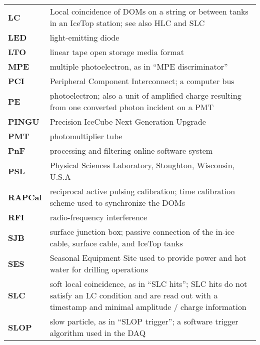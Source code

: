 \begin{longtable}{p{} p{}}
  \textbf{LC} & Local coincidence of DOMs on a string or between tanks in 
  an IceTop station; see also HLC and SLC \\
  
  \textbf{LED} & light-emitting diode \\

  \textbf{LTO} & linear tape open storage media format \\
  
  \textbf{MPE} & multiple photoelectron, as in ``MPE discriminator'' \\

  \textbf{PCI} & Peripheral Component Interconnect; a computer bus \\
  
  \textbf{PE} & photoelectron; also a unit of amplified charge resulting
  from one converted photon incident on a PMT \\

  \textbf{PINGU} & Precision IceCube Next Generation Upgrade \\
  
  \textbf{PMT} & photomultiplier tube \\

  \textbf{PnF} & processing and filtering online software system \\
  
  \textbf{PSL} & Physical Sciences Laboratory, Stoughton, Wisconsin, U.S.A \\

  \textbf{RAPCal} & reciprocal active pulsing calibration; time calibration
  scheme used to synchronize the DOMs \\

  \textbf{RFI} & radio-frequency interference \\

  \textbf{SJB} & surface junction box; passive connection of the in-ice
  cable, surface cable, and IceTop tanks \\

  \textbf{SES} & Seasonal Equipment Site used to provide power and hot
  water for drilling operations \\
  
  \textbf{SLC} & soft local coincidence, as in ``SLC hits''; SLC hits do
  not satisfy an LC condition and are read out with a timestamp and minimal
  amplitude / charge information \\

  \textbf{SLOP} & slow particle, as in ``SLOP trigger''; a software trigger
  algorithm used in the DAQ \\
  

\end{longtable}
